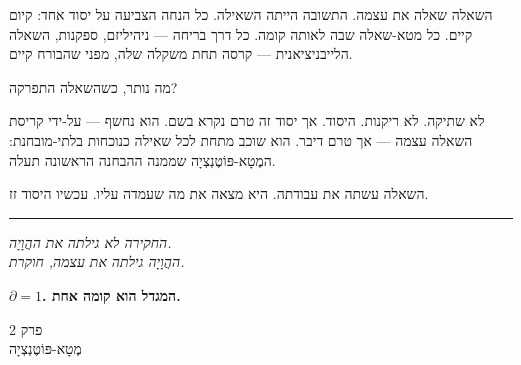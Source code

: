\documentclass[10pt, openany, oneside]{book}
\renewcommand{\large}{\fontsize{11.5}{14}\selectfont}
\renewcommand{\huge}{\fontsize{17}{21}\selectfont}
\begin{document}
\vspace{1.5em}


השאלה שאלה את עצמה. התשובה הייתה השאילה. כל הנחה הצביעה על יסוד אחד: קיום קיים. כל מטא-שאלה שבה לאותה קומה. כל דרך בריחה — ניהיליזם, ספקנות, השאלה הלייבניציאנית — קרסה תחת משקלה שלה, מפני שהבורח קיים.

מה נותר, כשהשאלה התפרקה?

לא שתיקה. לא ריקנות. היסוד. אך יסוד זה טרם נקרא בשם. הוא נחשף — על-ידי קריסת השאלה עצמה — אך טרם דיבר. הוא שוכב מתחת לכל שאילה כנוכחות בלתי-מובחנת: המֶטָא-פּוֹטֶנְצְיָה שממנה ההבחנה הראשונה תעלה.

השאלה עשתה את עבודתה. היא מצאה את מה שעמדה עליו. עכשיו היסוד זז.

\vspace{2em}

\begin{center}
    \rule{0.15\textwidth}{0.3pt}
\end{center}

\vspace{0.5em}

\begin{center}
    \textit{%
    החקירה לא גילתה את ההֲוָיָה.\\
    ההֲוָיָה גילתה את עצמה, חוקרת.}
\end{center}

\vspace{0.5em}

\begin{center}
    \textbf{$\partial = 1$. המגדל הוא קומה אחת.}
\end{center}

%
%
%

\newpage

\begin{center}
    {\huge\textsc{פרק 2}}\\[0.3em]
    {\large\textsc{מֶטָא-פּוֹטֶנְצְיָה}}
\end{center}

\vspace{1.5em}
\end{document}
